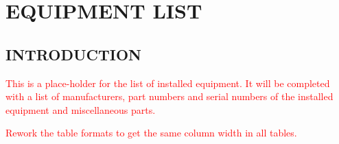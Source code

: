 \chapter{EQUIPMENT LIST}
\vspace{\minitocspacebefore}
\minitoc
\cleardoublepage

\section{INTRODUCTION}
\textcolor{red}{This is a place-holder for the list of installed equipment.  It will be completed with a list of manufacturers, part numbers and serial numbers of the installed equipment and miscellaneous parts.}

\textcolor{red}{Rework the table formats to get the same column width in all tables.}
